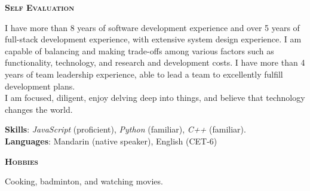 \documentclass[a4paper]{article}
\newenvironment{changemargin}[2]{%
  \begin{list}{}{%
    \setlength{\topsep}{0pt}%
    \setlength{\leftmargin}{#1}%
    \setlength{\rightmargin}{#2}%
    \setlength{\listparindent}{\parindent}%
    \setlength{\itemindent}{\parindent}%
    \setlength{\parsep}{\parskip}%
  }%
  \item[]}{\end{list}
}
\newcommand{\lineover}{
	\begin{changemargin}{-0.05in}{-0.05in}
		\vspace*{-8pt}
		\hrulefill \\
		\vspace*{-2pt}
	\end{changemargin}
}
\newcommand{\header}[1]{
	\begin{changemargin}{-0.5in}{-0.5in}
		\scshape{\large \textbf{#1}}\\
	\end{changemargin}
}
\newenvironment{body} {
	\vspace*{-16pt}
	\begin{changemargin}{-0.5in}{-0.5in}
  }
	{\end{changemargin}
}
\begin{document}
\medskip


\header{Self Evaluation}

\begin{body}
	\vspace{16pt}
	\begin{justify}
		I have more than 8 years of software development experience and over 5 years of full-stack development experience, with extensive system design experience. I am capable of balancing and making trade-offs among various factors such as functionality, technology, and research and development costs. I have more than 4 years of team leadership experience, able to lead a team to excellently fulfill development plans.\\
		I am focused, diligent, enjoy delving deep into things, and believe that technology changes the world.\\
	\end{justify}
	\vspace{-6pt}
	\textbf{Skills}: \emph{JavaScript} (proficient), \emph{Python} (familiar), \emph{C++} (familiar).\\
	\textbf{Languages}: Mandarin {(native speaker)}, English {(CET-6)}\\
\end{body}

\medskip

\header{Hobbies}

\begin{body}
	\vspace{16pt}
	Cooking, badminton, and watching movies.\\
\end{body}
\end{document}
